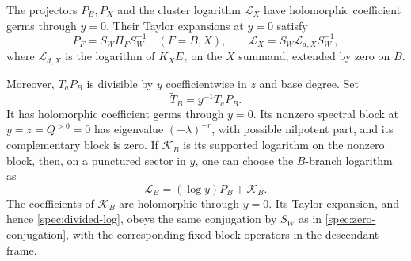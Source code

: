 \begin{proposition}
\label{spec:zero}
The projectors $P_B,P_X$ and the cluster logarithm
$\mathscr L_X$ have holomorphic coefficient germs through $y=0$.
Their Taylor expansions at $y=0$ satisfy
\begin{equation}
 P_F=S_W\Pi_FS_W^{-1}\quad(F=B,X),\qquad
 \mathscr L_X=S_W\mathscr L_{d,X}S_W^{-1},
 \label{spec:zero-conjugation}
\end{equation}
where $\mathscr L_{d,X}$ is the logarithm of $K_XE_z$ on the $X$
summand, extended by zero on $B$.

Moreover, $T_aP_B$ is divisible by $y$ coefficientwise in $z$ and
base degree.  Set
\begin{equation}
 \widetilde T_B=y^{-1}T_aP_B.
 \label{spec:divided-shift}
\end{equation}
It has holomorphic coefficient germs through $y=0$.  Its
nonzero spectral block at $y=z=Q^{>0}=0$ has eigenvalue
$(-\lambda)^{-r}$, with possible nilpotent part, and its
complementary block is zero.  If $\mathscr K_B$ is its supported
logarithm on the nonzero block, then, on a punctured sector in
$y$, one can choose the $B$-branch logarithm as
\begin{equation}
 \mathscr L_B=(\log y)P_B+\mathscr K_B.
 \label{spec:divided-log}
\end{equation}
The coefficients of $\mathscr K_B$ are holomorphic through $y=0$.
Its Taylor expansion, and hence \eqref{spec:divided-log}, obeys
the same conjugation by $S_W$ as in
\eqref{spec:zero-conjugation}, with the corresponding fixed-block
operators in the descendant frame.
\end{proposition}

